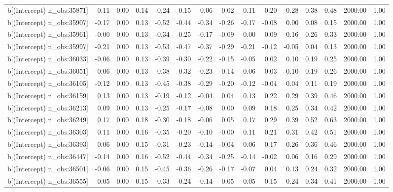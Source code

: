 \begin{table}[ht]
\begin{tabular}{rrrrrrrrrrrrrrr}
  b[(Intercept) n\_obs:35871] & 0.11 & 0.00 & 0.14 & -0.24 & -0.15 & -0.06 & 0.02 & 0.11 & 0.20 & 0.28 & 0.38 & 0.48 & 2000.00 & 1.00 \\ 
  b[(Intercept) n\_obs:35907] & -0.17 & 0.00 & 0.13 & -0.52 & -0.44 & -0.34 & -0.26 & -0.17 & -0.08 & 0.00 & 0.08 & 0.15 & 2000.00 & 1.00 \\ 
  b[(Intercept) n\_obs:35961] & -0.00 & 0.00 & 0.13 & -0.34 & -0.25 & -0.17 & -0.09 & 0.00 & 0.09 & 0.16 & 0.26 & 0.33 & 2000.00 & 1.00 \\ 
  b[(Intercept) n\_obs:35997] & -0.21 & 0.00 & 0.13 & -0.53 & -0.47 & -0.37 & -0.29 & -0.21 & -0.12 & -0.05 & 0.04 & 0.13 & 2000.00 & 1.00 \\ 
  b[(Intercept) n\_obs:36033] & -0.06 & 0.00 & 0.13 & -0.39 & -0.30 & -0.22 & -0.15 & -0.05 & 0.02 & 0.10 & 0.19 & 0.25 & 2000.00 & 1.00 \\ 
  b[(Intercept) n\_obs:36051] & -0.06 & 0.00 & 0.13 & -0.38 & -0.32 & -0.23 & -0.14 & -0.06 & 0.03 & 0.10 & 0.19 & 0.26 & 2000.00 & 1.00 \\ 
  b[(Intercept) n\_obs:36105] & -0.12 & 0.00 & 0.13 & -0.45 & -0.38 & -0.29 & -0.20 & -0.12 & -0.04 & 0.04 & 0.11 & 0.19 & 2000.00 & 1.00 \\ 
  b[(Intercept) n\_obs:36159] & 0.13 & 0.00 & 0.13 & -0.19 & -0.12 & -0.04 & 0.04 & 0.13 & 0.22 & 0.29 & 0.39 & 0.46 & 2000.00 & 1.00 \\ 
  b[(Intercept) n\_obs:36213] & 0.09 & 0.00 & 0.13 & -0.25 & -0.17 & -0.08 & 0.00 & 0.09 & 0.18 & 0.25 & 0.34 & 0.42 & 2000.00 & 1.00 \\ 
  b[(Intercept) n\_obs:36249] & 0.17 & 0.00 & 0.18 & -0.30 & -0.18 & -0.06 & 0.05 & 0.17 & 0.29 & 0.39 & 0.52 & 0.63 & 2000.00 & 1.00 \\ 
  b[(Intercept) n\_obs:36303] & 0.11 & 0.00 & 0.16 & -0.35 & -0.20 & -0.10 & -0.00 & 0.11 & 0.21 & 0.31 & 0.42 & 0.51 & 2000.00 & 1.00 \\ 
  b[(Intercept) n\_obs:36393] & 0.06 & 0.00 & 0.15 & -0.31 & -0.23 & -0.14 & -0.04 & 0.06 & 0.17 & 0.26 & 0.36 & 0.46 & 2000.00 & 1.00 \\ 
  b[(Intercept) n\_obs:36447] & -0.14 & 0.00 & 0.16 & -0.52 & -0.44 & -0.34 & -0.25 & -0.14 & -0.02 & 0.06 & 0.16 & 0.29 & 2000.00 & 1.00 \\ 
  b[(Intercept) n\_obs:36501] & -0.06 & 0.00 & 0.15 & -0.45 & -0.36 & -0.26 & -0.17 & -0.07 & 0.04 & 0.13 & 0.24 & 0.32 & 2000.00 & 1.00 \\ 
  b[(Intercept) n\_obs:36555] & 0.05 & 0.00 & 0.15 & -0.33 & -0.24 & -0.14 & -0.05 & 0.05 & 0.15 & 0.24 & 0.34 & 0.41 & 2000.00 & 1.00 \\ 

\end{tabular}
\end{table}
